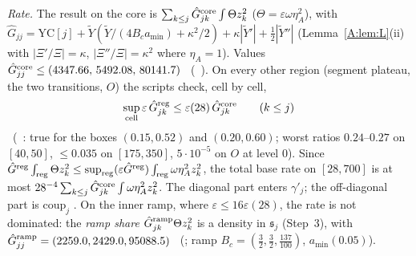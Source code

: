 \documentclass[11pt]{article}
\begin{document}
\emph{Rate.} The result on the core is $\sum_{k\le j}\hat G^{\rm core}_{jk}\int\Theta z_k^2$ ($\Theta=\varepsilon\omega\eta_A^2$), with $\hat G_{jj}=\mathrm{YC}[j]+\tilde Y(\tilde Y/(4B_ca_{\min})+\kappa^2/2)+\kappa|\tilde Y'|+\frac12|\tilde Y''|$ (Lemma~\ref{A:lem:L}(ii) with $|\Xi'/\Xi|=\kappa$, $|\Xi''/\Xi|=\kappa^2$ where $\eta_A=1$). Values $\hat G^{\rm core}_{jj}\le(4347.66,\,5492.08,\,80141.7)$ \tC\ (\SA\ ). On every other region (segment plateau, the two transitions, $O$) the scripts check, cell by cell,
\[
\sup_{\rm cell}\varepsilon\,\hat G^{\rm reg}_{jk}\le\varepsilon(28)\,\hat G^{\rm core}_{jk}\qquad(k\le j)
\]
\tC\ (\SA\ :  true for the boxes $(0.15,0.52)$ and $(0.20,0.60)$; worst ratios $0.24$--$0.27$ on $[40,50]$, $\le0.035$ on $[175,350]$, $5\cdot10^{-5}$ on $O$ at level 0). Since $\hat G^{\rm reg}\int_{\rm reg}\Theta z_k^2\le\sup_{\rm reg}(\varepsilon\hat G^{\rm reg})\int_{\rm reg}\omega\eta_A^2z_k^2$, the total base rate on $[28,700]$ is at most $28^{-4}\sum_{k\le j}\hat G^{\rm core}_{jk}\int\omega\eta_A^2z_k^2$. The diagonal part enters $\gamma'_j$; the off-diagonal part is $\mathrm{coup}_j$ \tP. On the inner ramp, where $\varepsilon\le16\varepsilon(28)$, the rate is not dominated: the \emph{ramp share} $\hat G^{\rm ramp}_{jk}\Theta z_k^2$ is a density in $\mathfrak s_j$ (Step~3), with $\hat G^{\rm ramp}_{jj}=(2259.0,2429.0,95088.5)$ \tC\ (; ramp $B_c=(\frac32,\frac32,\frac{137}{100})$, $a_{\min}(0.05)$).
\end{document}
